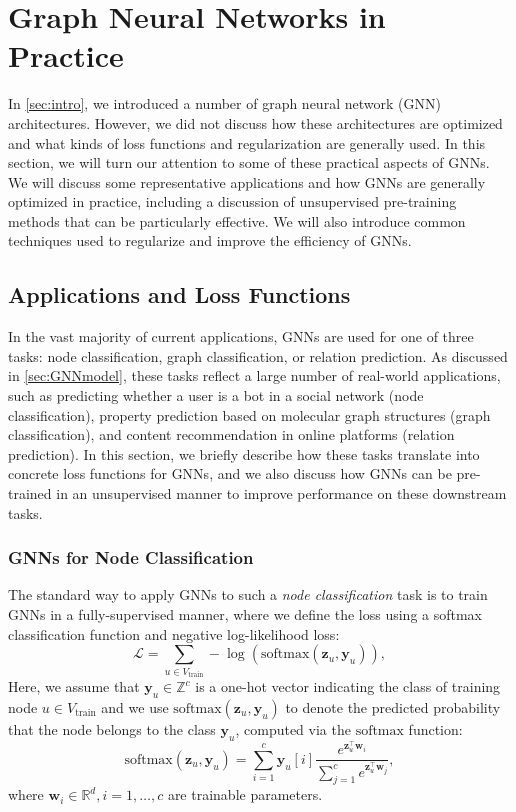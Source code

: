 \documentclass[10pt]{book}
\let\defaultmarginpar\marginpar
\renewcommand\marginpar[2][]{\defaultmarginpar{\itshape\color{gray}#2}}
\begin{document}
\section{Graph Neural Networks in Practice}

In \autoref{sec:intro}, we introduced a number of graph neural network (GNN) architectures. However, we did not discuss how these architectures are optimized and what kinds of loss functions and regularization are generally used. In this section, we will turn our attention to some of these practical aspects of GNNs. We will discuss some representative applications and how GNNs are generally optimized in practice, including a discussion of unsupervised pre-training methods that can be particularly effective. We will also introduce common techniques used to regularize and improve the efficiency of GNNs.

\subsection{Applications and Loss Functions}

In the vast majority of current applications, GNNs are used for one of three tasks: node classification, graph classification, or relation prediction. As discussed in \autoref{sec:GNNmodel}, these tasks reflect a large number of real-world applications, such as predicting whether a user is a bot in a social network (node classification), property prediction based on molecular graph structures (graph classification), and content recommendation in online platforms (relation prediction). In this section, we briefly describe how these tasks translate into concrete loss functions for GNNs, and we also discuss how GNNs can be pre-trained in an unsupervised manner to improve performance on these downstream tasks.

\subsubsection{GNNs for Node Classification}

The standard way to apply GNNs to such a \emph{node classification}\marginpar{node classification} task is to train GNNs in a fully-supervised manner, where we define the loss using a softmax classification function and negative log-likelihood loss:
\begin{equation}
    \mathcal L = \sum_{u \in V_\text{train}} -\log(\text{softmax}(\mathbf z_u, \mathbf y_u)),
    \label{eq:lossnodeclass}
\end{equation}
Here, we assume that $\mathbf y_u \in \mathbb Z^c$ is a one-hot vector indicating the class of training node $u \in V_\text{train}$ and we use $\text{softmax}(\mathbf z_u, \mathbf y_u)$ to denote the predicted probability that the node belongs to the class $\mathbf y_u$, computed via the $\text{softmax}$ function:
\begin{equation}
    \text{softmax}(\mathbf z_u, \mathbf y_u) = \sum^c_{i=1} \mathbf y_u[i] \frac{e^{\mathbf z_u^\top \mathbf w_i}}{\sum^c_{j=1} e^{\mathbf z_u^\top \mathbf w_j}},
\end{equation}
where $\mathbf w_i \in \mathbb R^d, i = 1, \ldots, c$ are trainable parameters.
\end{document}
